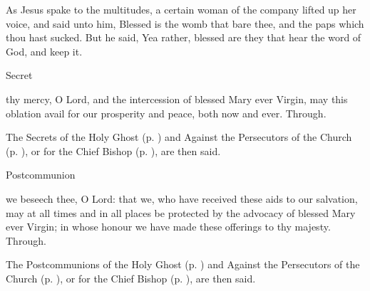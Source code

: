  As Jesus spake to the multitudes, a certain woman of the company lifted up her voice, and said unto him, Blessed is the womb that bare thee, and the paps which thou hast sucked. But he said, Yea rather, blessed are they that hear the word of God, and keep it.
\begin{inhead}
    Secret
\end{inhead}
 thy mercy, O Lord, and the intercession of blessed Mary ever Virgin, may this oblation avail for our prosperity and peace, both now and ever. Through.
\begin{rubric}
    The Secrets of the Holy Ghost (p. \pageref{SPHolyGhost}) and Against the Persecutors of the Church (p. \pageref{SPAgainst}), or for the Chief Bishop (p. \pageref{SPChiefBishop}), are then said.
\end{rubric}
\begin{inhead}
    Postcommunion
\end{inhead}
 we beseech thee, O Lord: that we, who have received these aids to our salvation, may at all times and in all places be protected by the advocacy of blessed Mary ever Virgin; in whose honour we have made these offerings to thy majesty. Through.
\begin{rubric}
    The Postcommunions of the Holy Ghost (p. \pageref{SPHolyGhost}) and Against the Persecutors of the Church (p. \pageref{SPAgainst}), or for the Chief Bishop (p. \pageref{SPChiefBishop}), are then said.
\end{rubric}

